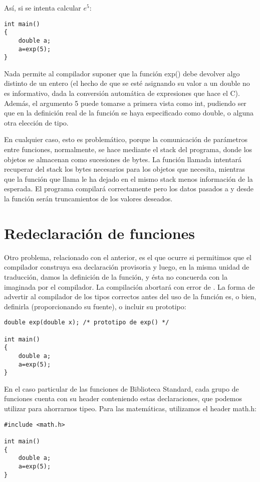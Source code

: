 Así, si se intenta calcular $e^5$:
\begin{lstlisting}
int main()
{
    double a;
    a=exp(5);
}
\end{lstlisting}

Nada permite al compilador suponer que la función exp() debe devolver algo
distinto de un entero (el hecho de que se esté asignando su valor a un double
no es informativo, dada la conversión automática de expresiones que hace el C).
Además, el argumento 5 puede tomarse a primera vista como int, pudiendo ser que
en la definición real de la función se haya especificado como double, o alguna
otra elección de tipo.

En cualquier caso, esto es problemático, porque la comunicación de parámetros
entre funciones, normalmente, se hace mediante el stack del programa, donde los
objetos se almacenan como sucesiones de bytes. La función llamada intentará
recuperar del stack los bytes necesarios para  los objetos que necesita,
mientras que la función que llama le ha dejado en el mismo stack menos
información de la esperada. El programa compilará correctamente pero los datos
pasados a y desde la función serán truncamientos de los valores deseados.

\section{Redeclaración de funciones}
Otro problema, relacionado con el anterior, es el que ocurre si permitimos que
el compilador construya esa declaración provisoria y luego, en la misma unidad
de traducción, damos la definición de la función, y ésta no concuerda con la
imaginada por el compilador. La compilación abortará con error de
.
La forma de advertir al compilador de los tipos correctos antes del uso de la
función es, o bien, definirla (proporcionando su fuente), o incluir su
prototipo:
\begin{lstlisting}
double exp(double x); /* prototipo de exp() */

int main()
{
    double a;
    a=exp(5);
}
\end{lstlisting}

En el caso particular de las funciones de Biblioteca Standard, cada grupo de
funciones cuenta con su header conteniendo estas declaraciones, que podemos
utilizar para ahorrarnos tipeo. Para las matemáticas, utilizamos el header
math.h:
\begin{lstlisting}
#include <math.h>

int main()
{
    double a;
    a=exp(5);
}
\end{lstlisting}

